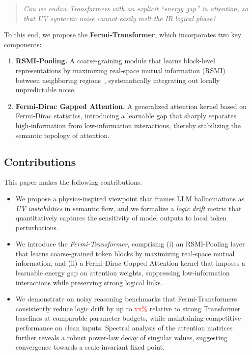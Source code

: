 \documentclass{article}
\newcommand{\TODO}[1]{\textcolor{red}{#1}}
\begin{document}
\begin{quote}
\emph{Can we endow Transformers with an explicit ``energy gap'' in attention, so that UV syntactic noise cannot easily melt the IR logical phase?}
\end{quote}

To this end, we propose the \textbf{Fermi-Transformer}, which incorporates two key components:

\begin{enumerate}[leftmargin=*,topsep=0pt]
    \item \textbf{RSMI-Pooling.} A coarse-graining module that learns block-level representations by maximizing real-space mutual information (RSMI) between neighboring regions~\cite{koch2018mutual}, systematically integrating out locally unpredictable noise.
    \item \textbf{Fermi-Dirac Gapped Attention.} A generalized attention kernel based on Fermi-Dirac statistics, introducing a learnable gap that sharply separates high-information from low-information interactions, thereby stabilizing the semantic topology of attention.
\end{enumerate}

\subsection{Contributions}

This paper makes the following contributions:
\begin{itemize}[leftmargin=*]
    \item We propose a physics-inspired viewpoint that frames LLM hallucinations as \emph{UV instabilities} in semantic flow, and we formalize a \emph{logic drift} metric that quantitatively captures the sensitivity of model outputs to local token perturbations.
    \item We introduce the \emph{Fermi-Transformer}, comprising (i) an RSMI-Pooling layer that learns coarse-grained token blocks by maximizing real-space mutual information, and (ii) a Fermi-Dirac Gapped Attention kernel that imposes a learnable energy gap on attention weights, suppressing low-information interactions while preserving strong logical links.
    \item We demonstrate on noisy reasoning benchmarks that Fermi-Transformers consistently reduce logic drift by up to \TODO{xx\%} relative to strong Transformer baselines at comparable parameter budgets, while maintaining competitive performance on clean inputs. Spectral analysis of the attention matrices further reveals a robust power-law decay of singular values, suggesting convergence towards a scale-invariant fixed point.
\end{itemize}
\end{document}
